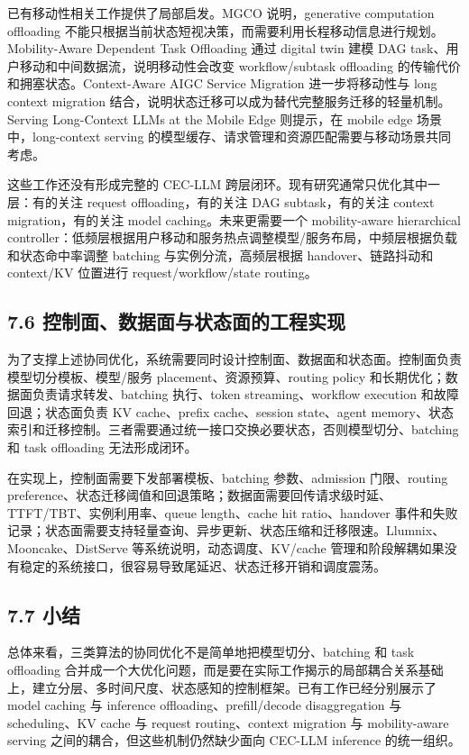 \documentclass[a4paper,twocolumn,10pt]{ctexart}
\begin{document}
已有移动性相关工作提供了局部启发。MGCO 说明，generative computation offloading 不能只根据当前状态短视决策，而需要利用长程移动信息进行规划。Mobility-Aware Dependent Task Offloading 通过 digital twin 建模 DAG task、用户移动和中间数据流，说明移动性会改变 workflow/subtask offloading 的传输代价和拥塞状态。Context-Aware AIGC Service Migration 进一步将移动性与 long context migration 结合，说明状态迁移可以成为替代完整服务迁移的轻量机制。Serving Long-Context LLMs at the Mobile Edge 则提示，在 mobile edge 场景中，long-context serving 的模型缓存、请求管理和资源匹配需要与移动场景共同考虑。


这些工作还没有形成完整的 CEC-LLM 跨层闭环。现有研究通常只优化其中一层：有的关注 request offloading，有的关注 DAG subtask，有的关注 context migration，有的关注 model caching。未来更需要一个 mobility-aware hierarchical controller：低频层根据用户移动和服务热点调整模型/服务布局，中频层根据负载和状态命中率调整 batching 与实例分流，高频层根据 handover、链路抖动和 context/KV 位置进行 request/workflow/state routing。


\subsection{7.6 控制面、数据面与状态面的工程实现}

为了支撑上述协同优化，系统需要同时设计控制面、数据面和状态面。控制面负责模型切分模板、模型/服务 placement、资源预算、routing policy 和长期优化；数据面负责请求转发、batching 执行、token streaming、workflow execution 和故障回退；状态面负责 KV cache、prefix cache、session state、agent memory、状态索引和迁移控制。三者需要通过统一接口交换必要状态，否则模型切分、batching 和 task offloading 无法形成闭环。


在实现上，控制面需要下发部署模板、batching 参数、admission 门限、routing preference、状态迁移阈值和回退策略；数据面需要回传请求级时延、TTFT/TBT、实例利用率、queue length、cache hit ratio、handover 事件和失败记录；状态面需要支持轻量查询、异步更新、状态压缩和迁移限速。Llumnix、Mooncake、DistServe 等系统说明，动态调度、KV/cache 管理和阶段解耦如果没有稳定的系统接口，很容易导致尾延迟、状态迁移开销和调度震荡。


\subsection{7.7 小结}

总体来看，三类算法的协同优化不是简单地把模型切分、batching 和 task offloading 合并成一个大优化问题，而是要在实际工作揭示的局部耦合关系基础上，建立分层、多时间尺度、状态感知的控制框架。已有工作已经分别展示了 model caching 与 inference offloading、prefill/decode disaggregation 与 scheduling、KV cache 与 request routing、context migration 与 mobility-aware serving 之间的耦合，但这些机制仍然缺少面向 CEC-LLM inference 的统一组织。
\end{document}

